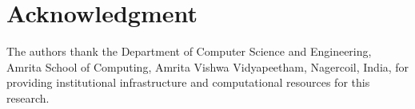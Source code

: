 \documentclass[journal,10pt,twocolumn]{IEEEtran}
\begin{document}
\section*{Acknowledgment}
The authors thank the Department of Computer Science and Engineering, Amrita School of Computing, Amrita Vishwa Vidyapeetham, Nagercoil, India, for providing institutional infrastructure and computational resources for this research.



\end{document}
